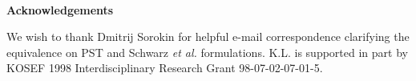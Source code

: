 \documentclass[a4paper,12pt]{article}
\renewcommand{\thesection}{\Roman{section}.}
\renewcommand{\theequation}{\thesection\arabic{equation}}
\begin{document}
~\newline
~\newline
~\newline
\begin{center}
\large{\textbf{Acknowledgements}}
\end{center}
We wish to thank Dmitrij Sorokin for helpful e-mail correspondence clarifying the equivalence on PST and Schwarz \textit{et al.} formulations. K.L. is supported in part by KOSEF 1998 Interdisciplinary Research Grant 98-07-02-07-01-5.
\newline
\setcounter{equation}{0}


\newpage


\end{document}
